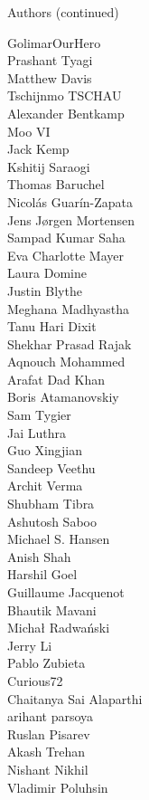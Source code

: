 \begin{frame}{Authors (continued)}
\begin{multicols}{5}
\tiny
GolimarOurHero\\
Prashant Tyagi\\
Matthew Davis\\
Tschijnmo TSCHAU\\
Alexander Bentkamp\\
Moo VI\\
Jack Kemp\\
Kshitij Saraogi\\
Thomas Baruchel\\
Nicolás Guarín-Zapata\\
Jens Jørgen Mortensen\\
Sampad Kumar Saha\\
Eva Charlotte Mayer\\
Laura Domine\\
Justin Blythe\\
Meghana Madhyastha\\
Tanu Hari Dixit\\
Shekhar Prasad Rajak\\
Aqnouch Mohammed\\
Arafat Dad Khan\\
Boris Atamanovskiy\\
Sam Tygier\\
Jai Luthra\\
Guo Xingjian\\
Sandeep Veethu\\
Archit Verma\\
Shubham Tibra\\
Ashutosh Saboo\\
Michael S. Hansen\\
Anish Shah\\
Harshil Goel\\
Guillaume Jacquenot\\
Bhautik Mavani\\
Michał Radwański\\
Jerry Li\\
Pablo Zubieta\\
Curious72\\
Chaitanya Sai Alaparthi\\
arihant parsoya\\
Ruslan Pisarev\\
Akash Trehan\\
Nishant Nikhil\\
Vladimir Poluhsin\\

\end{multicols}
\end{frame}
